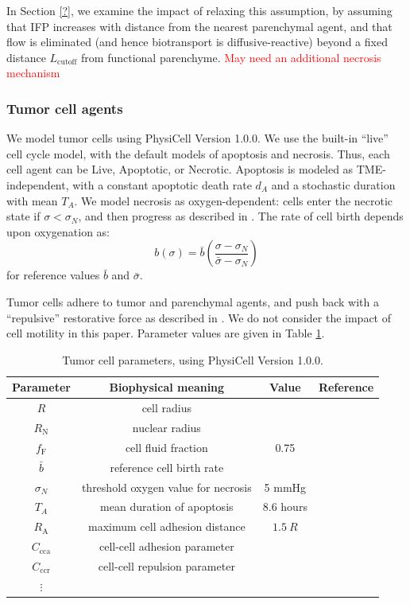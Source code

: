 \documentclass[smallextended,natbib]{svjour3}
\newcommand{\beq}{\begin{equation}}
\newcommand{\eeq}{\end{equation}}
\newcommand{\red}[1]{\textcolor{red}{#1}}
\begin{document}
In Section \ref{?}, we examine the impact of relaxing this 
assumption, by assuming that IFP increases with distance from the nearest parenchymal agent, and that flow is eliminated (and hence biotransport is 
diffusive-reactive) beyond a fixed distance $L_\mathrm{cutoff}$ from 
functional parenchyme. 
\red{May need an additional necrosis mechanism}

\subsubsection{Tumor cell agents}
We model tumor cells using PhysiCell \cite{?} Version 1.0.0. We use the built-in ``live'' cell cycle model, 
with the default models of apoptosis and necrosis. Thus, each cell agent can be Live, Apoptotic, or Necrotic. 
Apoptosis is modeled as TME-independent, with a constant apoptotic death rate $d_A$ and a stochastic 
duration with mean $T_A$. We model necrosis as oxygen-dependent: cells enter the necrotic state if 
$\sigma < \sigma_N$, and then progress as described in \cite{?}. The rate of cell birth depends upon 
oxygenation as: 
\beq
b(\sigma)= \bar{b} \left( \frac{ \sigma -\sigma_N }{ \bar{\sigma} - \sigma_N } \right) 
\eeq
for reference values $\bar{b}$ and $\bar{\sigma}$. 

Tumor cells adhere to tumor and parenchymal agents, and push back 
with a ``repulsive'' restorative force as described in \cite{?}. 
We do not consider the impact of cell motility in this paper. 
Parameter values are given in Table \ref{tab:tumor_physicell_parameters}. 


\begin{table}
\begin{tabular}{cccc}
\textbf{Parameter} & \textbf{Biophysical meaning} & \textbf{Value} & \textbf{Reference}\\
\hline 
$R$ & cell radius & \\
$R_\mathrm{N}$ & nuclear radius & \\
$f_\mathrm{F}$ & cell fluid fraction & 0.75 \\
$\bar{b}$ & reference cell birth rate &  \\
$\sigma_N$ & threshold oxygen value for necrosis & 5 mmHg & \\
$T_A$ & mean duration of apoptosis & 8.6 hours & \\
$R_\mathrm{A}$ & maximum cell adhesion distance & $ 1.5 \: R$ \\
$C_\mathrm{cca}$ & cell-cell adhesion parameter &  \\
$C_\mathrm{ccr}$ & cell-cell repulsion parameter & \\
$\vdots$
\end{tabular}
\caption{Tumor cell parameters, using PhysiCell Version 1.0.0.}
\label{tab:tumor_physicell_parameters}
\end{table}
\end{document}
